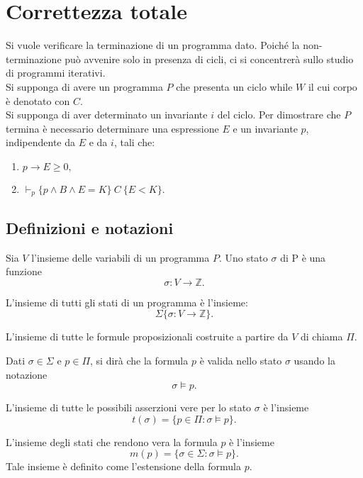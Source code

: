 \section{Correttezza totale}
Si vuole verificare la terminazione di un programma dato. Poich\'e la non-terminazione pu\`o avvenire solo in presenza di cicli, ci si concentrer\`a sullo studio di programmi iterativi.\\
Si supponga di avere un programma $P$ che presenta un ciclo while $W$ il cui corpo \`e denotato con $C$. \\
Si supponga di aver determinato un invariante $i$ del ciclo. Per dimostrare che $P$ termina \`e necessario determinare una espressione $E$ e un invariante $p$, indipendente da $E$ e da $i$, tali che:
\begin{enumerate}
	\item $ p \rightarrow E \geq 0,$
	\item $ \vdash_p \{ p \land B \land E=K  \}\ C\ \{E < K\}.  $
\end{enumerate}

\subsection{Definizioni e notazioni}
\begin{deff}
	Sia $V$ l'insieme delle variabili di un programma $P$. Uno stato $\sigma$ di P \`e una funzione $$\sigma: V \rightarrow \mathbb{Z}.$$
\end{deff}

\begin{deff}
	L'insieme di tutti gli stati di un programma \`e l'insieme: $$\Sigma \{\sigma:V\rightarrow \mathbb{Z}\}.$$
\end{deff}

\begin{deff}
	L'insieme di tutte le formule proposizionali costruite a partire da $V$ di chiama $\Pi$.
\end{deff}

Dati $\sigma \in \Sigma$ e $ p \in \Pi$, si dir\`a che la formula $p$ \`e valida nello stato $\sigma$ usando la notazione $$\sigma \models p.$$

\begin{deff}
	L'insieme di tutte le possibili asserzioni vere per lo stato $\sigma$ \`e l'insieme $$t(\sigma)=\{p \in \Pi : \sigma \models p\}.$$
\end{deff}

\begin{deff}
	L'insieme degli stati che rendono vera la formula $p$ \`e l'insieme $$m(p)=\{\sigma \in \Sigma : \sigma \models p \}.$$
	Tale insieme \`e definito come l'estensione della formula $p$.
\end{deff}

